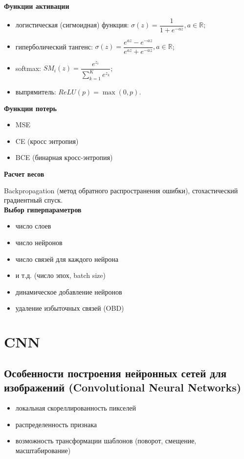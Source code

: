 \documentclass{article}
\begin{document}
	\textbf{Функции активации}
	\begin{itemize}
		\item логистическая (сигмоидная) функция: $\sigma(z) = \dfrac{1}{1+e^{-az}}, a \in \mathbb{R}$;
		\item гиперболический тангенс: $\sigma(z) = \dfrac{e^{az} - e^{-az}}{e^{az} + e^{-az}}, a \in \mathbb{R}$;
		\item softmax: $SM_i(z) = \dfrac{e^{z_i}}{\sum\limits_{k=1}^{K} e^{z_k}}$;
		\item выпрямитель: $ReLU(p) = \max(0, p)$.
	\end{itemize}
	
	\textbf{Функции потерь}
	\begin{itemize}
		\item MSE
		\item CE (кросс энтропия)
		\item BCE (бинарная кросс-энтропия)
	\end{itemize}
	
	\textbf{Расчет весов}
	
	Backpropagation (метод обратного распространения ошибки), стохастический градиентный спуск.\\
	
	\textbf{Выбор гиперпараметров}
	\begin{itemize}
		\item число слоев
		\item число нейронов
		\item число связей для каждого нейрона
		\item и т.д. (число эпох, batch size)
		\item динамическое добавление нейронов
		\item удаление избыточных связей (OBD)
	\end{itemize}

	\newpage

	\section{CNN}

	\subsection{Особенности построения нейронных сетей для изображений (Convolutional Neural Networks)}
	
	\begin{itemize}
		\item локальная скореллированность пикселей
		\item распределенность признака
		\item возможность трансформации шаблонов (поворот, смещение, масштабирование)
	\end{itemize}
\end{document}
